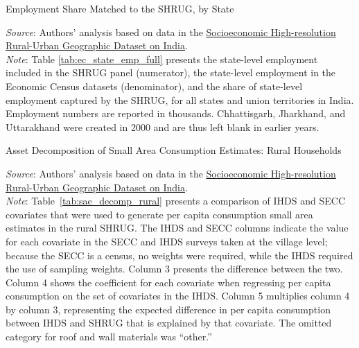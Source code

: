 \documentclass[12pt,letterpaper]{article}
\newcommand{\shrugpath}{.}
\begin{document}
\begin{appendix}
  \begin{table}[H]
    \caption{Employment Share Matched to the SHRUG, by State} 
    \vspace{-5mm}

  \begin{center}
    \tiny{}
  \end{center}
    
  \footnotesize \textit{Source}: Authors' analysis based on data in the \href{http://www.devdatalab.org/shrug}{Socioeconomic High-resolution
    Rural-Urban Geographic Dataset on India}.\\
  \footnotesize \textit{Note}: Table \ref{tab:ec_state_emp_full} presents
  the state-level employment included in the SHRUG panel
  (numerator), the state-level employment in the Economic Census
  datasets (denominator), and the share of state-level employment
  captured by the SHRUG, for all states and union territories in
  India. Employment numbers are reported in
  thousands. Chhattisgarh, Jharkhand, and Uttarakhand were
  created in 2000 and are thus left blank in earlier years.

  \label{tab:ec_state_emp_full}
  \end{table}

\begin{center}
  \begin{table}[H]
    \caption{Asset Decomposition of Small Area Consumption Estimates: \cnewline Rural Households} 
  \begin{center}
    \scriptsize{}
  \end{center}
    \scriptsize \textit{Source}: Authors' analysis based on data in the \href{http://www.devdatalab.org/shrug}{Socioeconomic High-resolution
      Rural-Urban Geographic Dataset on India}. \\
    \scriptsize \textit{Note}: Table~\ref{tab:sae_decomp_rural} presents a
    comparison of IHDS and SECC covariates that were used to generate
    per capita consumption small area estimates in the rural
    SHRUG. The IHDS and SECC columns indicate the value for each
    covariate in the SECC and IHDS surveys taken at the village level;
    because the SECC is a census, no weights were required, while the
    IHDS required the use of sampling weights. Column 3 presents the
    difference between the two. Column 4 shows the coefficient for
    each covariate when regressing per capita consumption on the set
    of covariates in the IHDS. Column 5 multiplies column 4 by column
    3, representing the expected difference in per capita consumption
    between IHDS and SHRUG that is explained by that covariate. The
    omitted category for roof and wall materials was ``other.''
    

\end{table}
\end{center}
\end{appendix}
\end{document}

